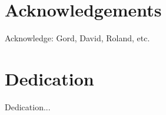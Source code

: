 


\tableofcontents                %
\listoffigures                  %

\chapter{Acknowledgements}      %
Acknowledge: Gord, David, Roland, etc.

\chapter{Dedication} %
Dedication...

